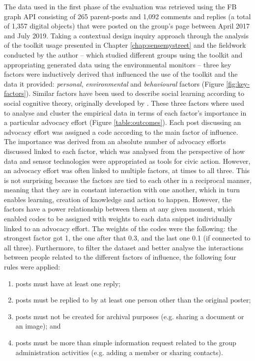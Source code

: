 The data used in the first phase of the evaluation was retrieved using the FB graph API consisting of 265 parent-posts and 1,092 comments and replies (a total of 1,357 digital objects) that were posted on the group's page between April 2017 and July 2019. Taking a contextual design inquiry approach \citep{beyer_contextual_1997} through the analysis of the toolkit usage presented in Chapter \ref{chap:sensemystreet} and the fieldwork conducted by the author -- which studied different groups using the toolkit and appropriating generated data using the environmental monitors -- three key factors were inductively derived that influenced the use of the toolkit and the data it provided: \textit{personal}, \textit{environmental} and \textit{behavioural} factors (Figure \ref{fig:key-factors}). Similar factors have been used to describe social learning according to social cognitive theory, originally developed by \citet{bandura_social_1977}. These three factors where used to analyse and cluster the empirical data in terms of each factor's importance in a particular advocacy effort (Figure \ref{table:outcomes}). Each post discussing an advocacy effort was assigned a code according to the main factor of influence. The importance was derived from an absolute number of advocacy efforts discussed linked to each factor, which was analysed from the perspective of how data and sensor technologies were appropriated as tools for civic action. However, an advocacy effort was often linked to multiple factors, at times to all three. This is not surprising because the factors are tied to each other in a reciprocal manner, meaning that they are in constant interaction with one another, which in turn enables learning, creation of knowledge and action to happen. However, the factors have a power relationship between them at any given moment, which enabled codes to be assigned with weights to each data snippet individually linked to an advocacy effort. The weights of the codes were the following: the strongest factor got 1, the one after that 0.3, and the last one 0.1 (if connected to all three). Furthermore, to filter the dataset and better analyse the interactions between people related to the different factors of influence, the following four rules were applied:
\begin{enumerate}
    \item posts must have at least one reply;
    \item posts must be replied to by at least one person other than the original poster;
    \item posts must not be created for archival purposes (e.g. sharing a document or an image); and
    \item posts must be more than simple information request related to the group administration activities (e.g. adding a member or sharing contacts).
\end{enumerate}
